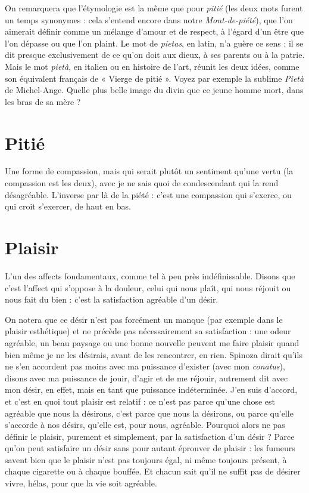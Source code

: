 On remarquera que l’étymologie est la même que pour {\it pitié} (les deux mots
furent un temps synonymes : cela s'entend encore dans notre {\it Mont-de-piété}),
que l’on aimerait définir comme un mélange d'amour et de respect, à l'égard
d’un être que l’on dépasse ou que l’on plaint. Le mot de {\it pietas}, en latin, n’a
guère ce sens : il se dit presque exclusivement de ce qu’on doit aux dieux, à ses
parents ou à la patrie. Mais le mot {\it pietà}, en italien ou en histoire de l’art, réunit
les deux idées, comme son équivalent français de « Vierge de pitié ». Voyez par
exemple la sublime {\it Pietà} de Michel-Ange. Quelle plus belle image du divin que
ce jeune homme mort, dans les bras de sa mère ?

\section{Pitié}
Une forme de compassion, mais qui serait plutôt un sentiment
qu’une vertu (la compassion est les deux), avec je ne sais quoi de
condescendant qui la rend désagréable. L’inverse par là de la piété : c'est une
compassion qui s'exerce, ou qui croit s'exercer, de haut en bas.

\section{Plaisir}
L'un des affects fondamentaux, comme tel à peu près indéfinissable.
Disons que c’est l’affect qui s'oppose à la douleur, celui qui
nous plaît, qui nous réjouit ou nous fait du bien : c’est la satisfaction agréable
d’un désir.

On notera que ce désir n’est pas forcément un manque (par exemple dans
le plaisir esthétique) et ne précède pas nécessairement sa satisfaction : une
odeur agréable, un beau paysage ou une bonne nouvelle peuvent me faire
plaisir quand bien même je ne les désirais, avant de les rencontrer, en rien.
Spinoza dirait qu’ils ne s’en accordent pas moins avec ma puissance d'exister
(avec mon {\it conatus}), disons avec ma puissance de jouir, d’agir et de me
réjouir, autrement dit avec mon désir, en effet, mais en tant que puissance
indéterminée. J'en suis d’accord, et c’est en quoi tout plaisir est relatif : ce
n’est pas parce qu’une chose est agréable que nous la désirons, c’est parce que
nous la désirons, ou parce qu’elle s’accorde à nos désirs, qu’elle est, pour
nous, agréable. Pourquoi alors ne pas définir le plaisir, purement et simplement,
par la satisfaction d’un désir ? Parce qu’on peut satisfaire un désir sans
pour autant éprouver de plaisir : les fumeurs savent bien que le plaisir n’est
pas toujours égal, ni même toujours présent, à chaque cigarette ou à chaque
bouffée. Et chacun sait qu’il ne suffit pas de désirer vivre, hélas, pour que la
vie soit agréable.

